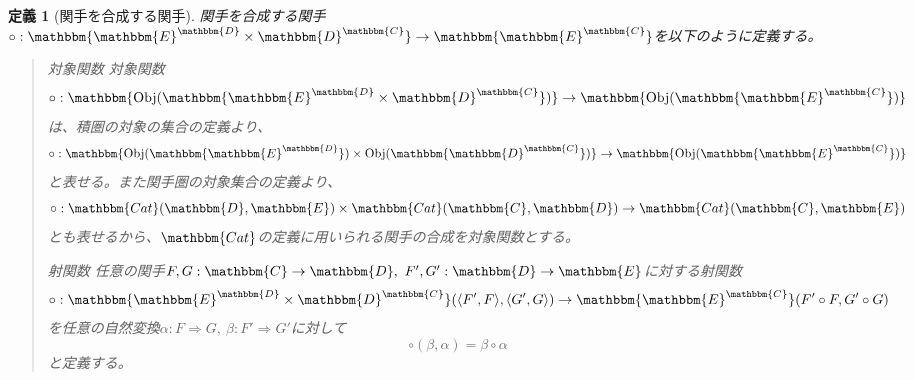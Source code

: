 \documentclass[uplatex,dvipdfmx]{jsarticle}
\newcommand{\cat}[1]{\mathbbm{#1}}
\newcommand{\arrow}{\rightarrow}
\newcommand{\functor}[3]{#1:\cat{#2}\arrow \cat{#3}}
\newcommand{\nat}[3]{#1:#2\Rightarrow #3}
\newcommand{\tuple}[1]{\langle #1\rangle}
\newcommand{\obj}[1]{\mathrm{Obj}(\cat{#1})}
\newcommand{\mor}[3]{#1:#2\arrow #3}
\newcommand{\arset}[3]{\cat{#1}(#2,#3)}
\newcommand{\funccat}[2]{\cat{#2}^\cat{#1}}
\newtheorem{define}[proof]{定義}
\numberwithin{proof}{subsection}
\newenvironment{mydescription}
{\begin{description}
  \setlength{\parskip}{0.5cm}
}
{\end{description}}
\begin{document}
  \begin{define}[関手を合成する関手]
    関手を合成する関手$\functor{\circ}{\funccat{D}{E}\times \funccat{C}{D}}{\funccat{C}{E}}$を以下のように定義する。
    \begin{quote}
			\begin{mydescription}
		\item[対象関数]対象関数
    \[\functor{\circ}{\obj{\funccat{D}{E}\times\funccat{C}{D}}}{\obj{\funccat{C}{E}}}\]は、積圏の対象の集合の定義より、\[\functor{\circ}{\obj{\funccat{D}{E}}\times\obj{\funccat{C}{D}}}{\obj{\funccat{C}{E}}}\]と表せる。また関手圏の対象集合の定義より、\[\mor{\circ}{\arset{Cat}{\cat{D}}{\cat{E}}\times\arset{Cat}{\cat{C}}{\cat{D}}}{\arset{Cat}{\cat{C}}{\cat{E}}}\]とも表せるから、$\cat{Cat}$の定義に用いられる関手の合成を対象関数とする。
		\item[射関数]任意の関手$\functor{F,G}{C}{D},\ \functor{F',G'}{D}{E}$に対する射関数\[\mor{\circ}{\arset{\funccat{D}{E}\times\funccat{C}{D}}{\tuple{F',F}}{\tuple{G',G}}}{\arset{\funccat{C}{E}}{F'\circ F}{G'\circ G}}\]を任意の自然変換$\nat{\alpha}{F}{G},\ \nat{\beta}{F'}{G'}$に対して
    \[\circ(\beta,\alpha)=\beta\circ\alpha\]と定義する。
    \begin{center}
\end{center}
\end{mydescription}
\end{quote}
\end{define}
\end{document}
